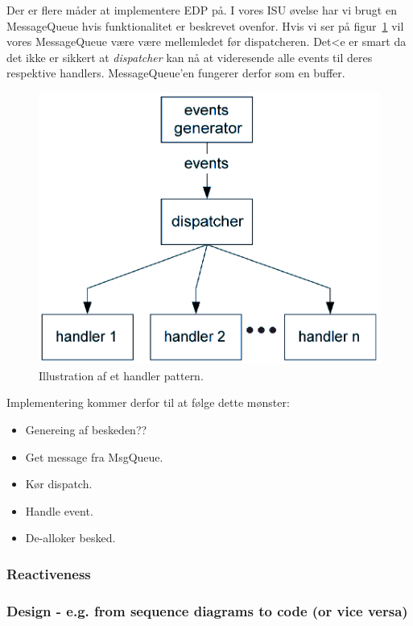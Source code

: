 Der er flere måder at implementere EDP på. I vores ISU øvelse har vi brugt en MessageQueue hvis funktionalitet er beskrevet ovenfor.
Hvis vi ser på figur~\ref{fig:handlPat} vil vores MessageQueue være være mellemledet før dispatcheren. Det<e er smart da det ikke er sikkert at \textit{dispatcher} kan nå at videresende alle events til deres respektive handlers. MessageQueue'en fungerer derfor som en buffer.

\begin{figure}[h]
	\centering
	\includegraphics[width=0.6\linewidth]{figs/spm3/handlersPattern}
	\caption{Illustration af et handler pattern.}
	\label{fig:handlPat}
\end{figure}

Implementering kommer derfor til at følge dette mønster:

\begin{itemize}
	\item Genereing af beskeden?? 
	\item Get message fra MsgQueue.
	\item Kør dispatch.
	\item Handle event.
	\item De-alloker besked.
\end{itemize}

\subsubsection{Reactiveness}

\subsubsection{Design - e.g. from sequence diagrams to code (or vice versa)}
